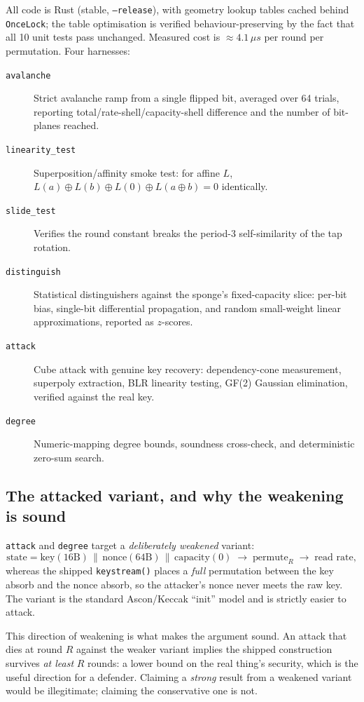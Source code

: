 \documentclass[11pt,a4paper]{article}
\theoremstyle{plain}
\theoremstyle{definition}
\theoremstyle{remark}
\begin{document}
All code is Rust (stable, \texttt{--release}), with geometry lookup tables cached
behind \texttt{OnceLock}; the table optimisation is verified behaviour-preserving by
the fact that all 10 unit tests pass unchanged. Measured cost is
$\approx 4.1\,\mu s$ per round per permutation. Four harnesses:

\begin{description}
  \item[\texttt{avalanche}] Strict avalanche ramp from a single flipped bit, averaged
    over 64 trials, reporting total/rate-shell/capacity-shell difference and the
    number of bit-planes reached.
  \item[\texttt{linearity\_test}] Superposition/affinity smoke test: for affine $L$,
    $L(a)\oplus L(b)\oplus L(0)\oplus L(a\oplus b) = 0$ identically.
  \item[\texttt{slide\_test}] Verifies the round constant breaks the period-3
    self-similarity of the tap rotation.
  \item[\texttt{distinguish}] Statistical distinguishers against the sponge's
    fixed-capacity slice: per-bit bias, single-bit differential propagation, and
    random small-weight linear approximations, reported as $z$-scores.
  \item[\texttt{attack}] Cube attack with genuine key recovery: dependency-cone
    measurement, superpoly extraction, BLR linearity testing, GF(2) Gaussian
    elimination, verified against the real key.
  \item[\texttt{degree}] Numeric-mapping degree bounds, soundness cross-check, and
    deterministic zero-sum search.
\end{description}

\subsection{The attacked variant, and why the weakening is sound}
\label{sec:variant}

\texttt{attack} and \texttt{degree} target a \emph{deliberately weakened} variant:
\[
  \text{state} = \text{key}(16\text{B}) \,\|\, \text{nonce}(64\text{B}) \,\|\,
  \text{capacity}(0) \;\to\; \mathrm{permute}_R \;\to\; \text{read rate},
\]
whereas the shipped \texttt{keystream()} places a \emph{full} permutation between the
key absorb and the nonce absorb, so the attacker's nonce never meets the raw key. The
variant is the standard Ascon/Keccak ``init'' model and is strictly easier to attack.

This direction of weakening is what makes the argument sound. An attack that dies at
round $R$ against the weaker variant implies the shipped construction survives
\emph{at least} $R$ rounds: a lower bound on the real thing's security, which is the
useful direction for a defender. Claiming a \emph{strong} result from a weakened
variant would be illegitimate; claiming the conservative one is not.
\end{document}
